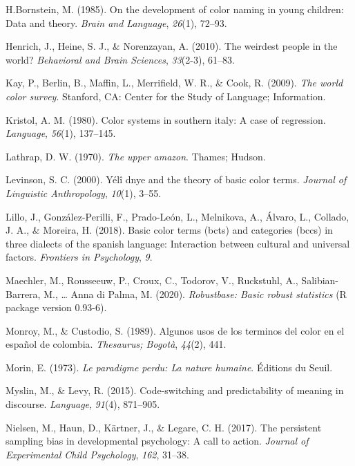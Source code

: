\documentclass[
  english,
  ,man,floatsintext]{apa6}
\begin{document}
\leavevmode\hypertarget{ref-bornstein1985}{}%
H.Bornstein, M. (1985). On the development of color naming in young children: Data and theory. \emph{Brain and Language}, \emph{26}(1), 72--93.

\leavevmode\hypertarget{ref-henrich2010}{}%
Henrich, J., Heine, S. J., \& Norenzayan, A. (2010). The weirdest people in the world? \emph{Behavioral and Brain Sciences}, \emph{33}(2-3), 61--83.

\leavevmode\hypertarget{ref-berlin2009}{}%
Kay, P., Berlin, B., Maffin, L., Merrifield, W. R., \& Cook, R. (2009). \emph{The world color survey}. Stanford, CA: Center for the Study of Language; Information.

\leavevmode\hypertarget{ref-kristol1980}{}%
Kristol, A. M. (1980). Color systems in southern italy: A case of regression. \emph{Language}, \emph{56}(1), 137--145.

\leavevmode\hypertarget{ref-lathrap1970}{}%
Lathrap, D. W. (1970). \emph{The upper amazon}. Thames; Hudson.

\leavevmode\hypertarget{ref-levinson2000}{}%
Levinson, S. C. (2000). Yélî dnye and the theory of basic color terms. \emph{Journal of Linguistic Anthropology}, \emph{10}(1), 3--55.

\leavevmode\hypertarget{ref-lillo2018}{}%
Lillo, J., González-Perilli, F., Prado-León, L., Melnikova, A., Álvaro, L., Collado, J. A., \& Moreira, H. (2018). Basic color terms (bcts) and categories (bccs) in three dialects of the spanish language: Interaction between cultural and universal factors. \emph{Frontiers in Psychology}, \emph{9}.

\leavevmode\hypertarget{ref-R-robustbase}{}%
Maechler, M., Rousseeuw, P., Croux, C., Todorov, V., Ruckstuhl, A., Salibian-Barrera, M., \ldots{} Anna di Palma, M. (2020). \emph{Robustbase: Basic robust statistics} (R package version 0.93-6).

\leavevmode\hypertarget{ref-monroy1989}{}%
Monroy, M., \& Custodio, S. (1989). Algunos usos de los terminos del color en el español de colombia. \emph{Thesaurus; Bogotà}, \emph{44}(2), 441.

\leavevmode\hypertarget{ref-morin1973}{}%
Morin, E. (1973). \emph{Le paradigme perdu: La nature humaine}. Éditions du Seuil.

\leavevmode\hypertarget{ref-myslin2015}{}%
Myslin, M., \& Levy, R. (2015). Code-switching and predictability of meaning in discourse. \emph{Language}, \emph{91}(4), 871--905.

\leavevmode\hypertarget{ref-nielson2017}{}%
Nielsen, M., Haun, D., Kärtner, J., \& Legare, C. H. (2017). The persistent sampling bias in developmental psychology: A call to action. \emph{Journal of Experimental Child Psychology}, \emph{162}, 31--38.
\end{document}
